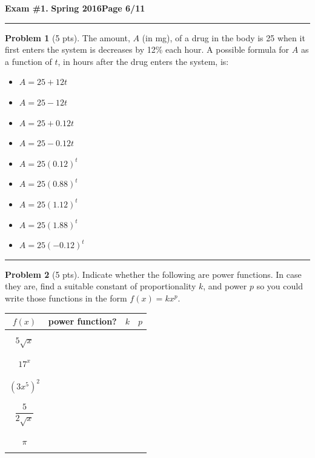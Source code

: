 \documentclass[12pt]{article}
\makeatletter
\theoremstyle{definition}
\newtheorem{problem}{Problem}
\newcommand*{\radiobutton}{%
  \@ifstar{\@radiobutton0}{\@radiobutton1}%
}
\newcommand*{\@radiobutton}[1]{%
  \begin{tikzpicture}
    \pgfmathsetlengthmacro\radius{height("X")/2}
    \draw[radius=\radius] circle;
    \ifcase#1 \fill[radius=.6*\radius] circle;\fi
  \end{tikzpicture}%
}
\makeatother
\begin{document}
\hfill{\large\bf Exam \#1.}\hfill{\large\bf
  Spring 2016}\hfill{\large\bf Page 6/11}\hrule

\begin{problem}[5 pts]
The amount, $A$ (in mg), of a drug in the body is 25 when it first enters the system is decreases by 12\% each hour. A possible formula for $A$ as a function of $t$, in hours after the drug enters the system, is:
\begin{itemize}
\item[\radiobutton] $A= 25+12t$
\item[\radiobutton] $A=25-12t$
\item[\radiobutton] $A=25+0.12t$
\item[\radiobutton] $A=25-0.12t$
\item[\radiobutton] $A=25(0.12)^t$
\item[\radiobutton] $A=25(0.88)^t$
\item[\radiobutton] $A=25(1.12)^t$
\item[\radiobutton] $A=25(1.88)^t$
\item[\radiobutton] $A=25(-0.12)^t$
\end{itemize}
\end{problem}

\vspace{1cm}
\hrule

\begin{problem}[5 pts]
Indicate whether the following are power functions. In case they are, find a suitable constant of proportionality $k$, and power $p$ so you could write those functions in the form $f(x) = kx^p$.
\begin{center}
\begin{tabular}{|c|c|c|c|}
\hline
$f(x)$ & power function? & $k$ & $p$ \\
\hline
\hline
&&& \\
$5\sqrt{x}$ &&\hspace{1cm} & \hspace{1cm} \\
&&& \\
\hline
&&& \\
$17^x$ &&& \\
&&& \\
\hline
&&& \\
$(3x^5)^2$ &&& \\
&&& \\
\hline
&&& \\
$\dfrac{5}{2\sqrt{x}}$ &&& \\
&&& \\
\hline
&&& \\
$\pi$ &&& \\
&&& \\
\hline
\end{tabular}
\end{center}
\end{problem}
\newpage
\end{document}
